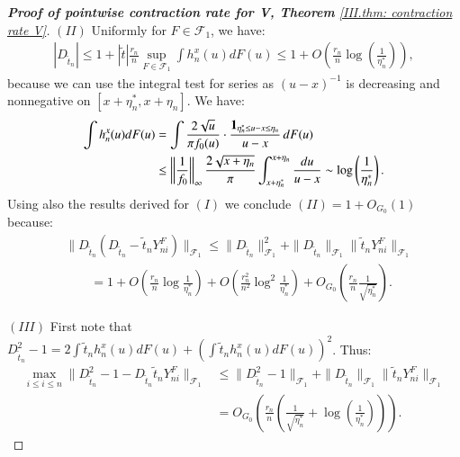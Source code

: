 \begin{proof}[\hypertarget{III.proof contraction pointwise V}{\textbf{Proof of pointwise contraction rate for V, Theorem} \ref{III.thm: contraction rate V}}]
    $(II)$ Uniformly for $F \in \mathcal{F}_1$, we have:
    \begin{align*}
    |D_{\tilde{t}_n}| \leq 1 + |\tilde{t}| \frac{r_n}{n} \sup_{F \in \mathcal{F}_1} \int h_n^x(u) dF(u) \leq 1 + O \left( \frac{r_n}{n} \log \left( \frac{1}{\eta_n^*} \right) \right),
    \end{align*}
    because we can use the integral test for series as $(u-x)^{-1}$ is decreasing and nonnegative on $[x+\eta_n^*, x+\eta_n]$. We have:
    \begin{align*}
    \int h_n^x(u) dF(u) &= \int \frac{2 \sqrt{u}}{\pi f_0(u)} \cdot \frac{\mathbf{1}_{\eta_n^* \leq u - x \leq \eta_n}}{u-x} \, dF(u) \\
    &\leq \left\| \frac{1}{f_0} \right\|_\infty \frac{2 \sqrt{x + \eta_n}}{\pi} \int_{x + \eta_n^*}^{x + \eta_n} \frac{du}{u-x} \sim \log \left(\frac{1}{\eta_n^*}\right).
    \end{align*}
    Using also the results derived for $(I)$ we conclude $(II) = 1 + O_{G_0}(1)$ because:
    \begin{align*}
    &\| D_{\tilde{t}_n} (D_{\tilde{t}_n} - \tilde{t}_n Y_{ni}^{\scriptscriptstyle{F}}) \|_{\mathcal{F}_1} \leq \| D_{\tilde{t}_n} \|_{\mathcal{F}_1}^2 + \| D_{\tilde{t}_n} \|_{\mathcal{F}_1} \| \tilde{t}_n Y_{ni}^{\scriptscriptstyle{F}} \|_{\mathcal{F}_1} \\
    &\quad \quad = 1 + O \left( \frac{r_n}{n} \log \frac{1}{\eta_n^*} \right) + O \left( \frac{r_n^2}{n^2} \log^2 \frac{1}{\eta_n^*} \right) + O_{\scriptscriptstyle{G_0}} \left( \frac{r_n}{n} \frac{1}{\sqrt{\eta_n^*}} \right).
    \end{align*}

    $(III)$ First note that $D_{\tilde{t}_n}^2 - 1 = 2 \int \tilde{t}_n h_n^x(u) dF(u) + \left( \int \tilde{t}_n h_n^x(u) dF(u) \right)^2$. Thus:
    \begin{align*}
    \max_{i \leq i \leq n} \| D_{\tilde{t}_n}^2 - 1 - D_{\tilde{t}_n} \tilde{t}_n Y_{ni}^{\scriptscriptstyle{F}} \|_{\mathcal{F}_1} &\leq \| D_{\tilde{t}_n}^2 - 1 \|_{\mathcal{F}_1} + \| D_{\tilde{t}_n} \|_{\mathcal{F}_1} \| \tilde{t}_n Y_{ni}^{\scriptscriptstyle{F}} \|_{\mathcal{F}_1} \\
    &= O_{\scriptscriptstyle{G_0}} \left( \frac{r_n}{n} \left( \frac{1}{\sqrt{\eta_n^*}} + \log \left( \frac{1}{\eta_n^*} \right) \right) \right).
    \end{align*}


\end{proof}
